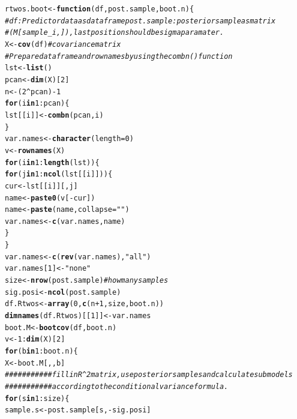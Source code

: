 \documentclass[11pt,a4paper,twoside]{book}\usepackage[]{graphicx}\usepackage[]{color}
\makeatletter
\newcommand{\hlnum}[1]{\textcolor[rgb]{0.686,0.059,0.569}{#1}}%
\newcommand{\hlstr}[1]{\textcolor[rgb]{0.192,0.494,0.8}{#1}}%
\newcommand{\hlcom}[1]{\textcolor[rgb]{0.678,0.584,0.686}{\textit{#1}}}%
\newcommand{\hlopt}[1]{\textcolor[rgb]{0,0,0}{#1}}%
\newcommand{\hlstd}[1]{\textcolor[rgb]{0.345,0.345,0.345}{#1}}%
\newcommand{\hlkwa}[1]{\textcolor[rgb]{0.161,0.373,0.58}{\textbf{#1}}}%
\newcommand{\hlkwb}[1]{\textcolor[rgb]{0.69,0.353,0.396}{#1}}%
\newcommand{\hlkwc}[1]{\textcolor[rgb]{0.333,0.667,0.333}{#1}}%
\newcommand{\hlkwd}[1]{\textcolor[rgb]{0.737,0.353,0.396}{\textbf{#1}}}%
\newenvironment{kframe}{%
 \def\at@end@of@kframe{}%
 \ifinner\ifhmode%
  \def\at@end@of@kframe{\end{minipage}}%
  \begin{minipage}{\columnwidth}%
 \fi\fi%
 \def\FrameCommand##1{\hskip\@totalleftmargin \hskip-\fboxsep
 \colorbox{shadecolor}{##1}\hskip-\fboxsep
     \hskip-\linewidth \hskip-\@totalleftmargin \hskip\columnwidth}%
 \MakeFramed {\advance\hsize-\width
   \@totalleftmargin\z@ \linewidth\hsize
   \@setminipage}}%
 {\par\unskip\endMakeFramed%
 \at@end@of@kframe}
\newenvironment{knitrout}{}{} %
\makeatother
\begin{document}
\begin{codeenv}
\begin{knitrout}
\begin{kframe}
\begin{alltt}
\hlstd{rtwos.boot} \hlkwb{<-} \hlkwa{function}\hlstd{(}\hlkwc{df}\hlstd{,} \hlkwc{post.sample}\hlstd{,} \hlkwc{boot.n}\hlstd{) \{}
    \hlcom{# df: Predictor data as data frame post.sample: posterior sample as matrix}
    \hlcom{# (M[sample_i,]), last position should be sigma paramater.}
    \hlstd{X} \hlkwb{<-} \hlkwd{cov}\hlstd{(df)}  \hlcom{#covariance matrix}
    \hlcom{# Prepare data frame and rownames by using the combn() function}
    \hlstd{lst} \hlkwb{<-} \hlkwd{list}\hlstd{()}
    \hlstd{pcan} \hlkwb{<-} \hlkwd{dim}\hlstd{(X)[}\hlnum{2}\hlstd{]}
    \hlstd{n} \hlkwb{<-} \hlstd{(}\hlnum{2}\hlopt{^}\hlstd{pcan)} \hlopt{-} \hlnum{1}
    \hlkwa{for} \hlstd{(i} \hlkwa{in} \hlnum{1}\hlopt{:}\hlstd{pcan) \{}
        \hlstd{lst[[i]]} \hlkwb{<-} \hlkwd{combn}\hlstd{(pcan, i)}
    \hlstd{\}}
    \hlstd{var.names} \hlkwb{<-} \hlkwd{character}\hlstd{(}\hlkwc{length} \hlstd{=} \hlnum{0}\hlstd{)}
    \hlstd{v} \hlkwb{<-} \hlkwd{rownames}\hlstd{(X)}
    \hlkwa{for} \hlstd{(i} \hlkwa{in} \hlnum{1}\hlopt{:}\hlkwd{length}\hlstd{(lst)) \{}
        \hlkwa{for} \hlstd{(j} \hlkwa{in} \hlnum{1}\hlopt{:}\hlkwd{ncol}\hlstd{(lst[[i]])) \{}
            \hlstd{cur} \hlkwb{<-} \hlstd{lst[[i]][, j]}
            \hlstd{name} \hlkwb{<-} \hlkwd{paste0}\hlstd{(v[}\hlopt{-}\hlstd{cur])}
            \hlstd{name} \hlkwb{<-} \hlkwd{paste}\hlstd{(name,} \hlkwc{collapse} \hlstd{=} \hlstr{" "}\hlstd{)}
            \hlstd{var.names} \hlkwb{<-} \hlkwd{c}\hlstd{(var.names, name)}
        \hlstd{\}}
    \hlstd{\}}
    \hlstd{var.names} \hlkwb{<-} \hlkwd{c}\hlstd{(}\hlkwd{rev}\hlstd{(var.names),} \hlstr{"all"}\hlstd{)}
    \hlstd{var.names[}\hlnum{1}\hlstd{]} \hlkwb{<-} \hlstr{"none"}
    \hlstd{size} \hlkwb{<-} \hlkwd{nrow}\hlstd{(post.sample)}  \hlcom{# how many samples}
    \hlstd{sig.posi} \hlkwb{<-} \hlkwd{ncol}\hlstd{(post.sample)}
    \hlstd{df.Rtwos} \hlkwb{<-} \hlkwd{array}\hlstd{(}\hlnum{0}\hlstd{,} \hlkwd{c}\hlstd{(n} \hlopt{+} \hlnum{1}\hlstd{, size, boot.n))}
    \hlkwd{dimnames}\hlstd{(df.Rtwos)[[}\hlnum{1}\hlstd{]]} \hlkwb{<-} \hlstd{var.names}
    \hlstd{boot.M} \hlkwb{<-} \hlkwd{bootcov}\hlstd{(df, boot.n)}
    \hlstd{v} \hlkwb{<-} \hlnum{1}\hlopt{:}\hlkwd{dim}\hlstd{(X)[}\hlnum{2}\hlstd{]}
    \hlkwa{for} \hlstd{(b} \hlkwa{in} \hlnum{1}\hlopt{:}\hlstd{boot.n) \{}
        \hlstd{X} \hlkwb{<-} \hlstd{boot.M[, , b]}
        \hlcom{########### fill in R^2 matrix, use posterior samples and calculate submodels}
        \hlcom{########### according to the conditional variance formula.}
        \hlkwa{for} \hlstd{(s} \hlkwa{in} \hlnum{1}\hlopt{:}\hlstd{size) \{}
            \hlstd{sample.s} \hlkwb{<-} \hlstd{post.sample[s,} \hlopt{-}\hlstd{sig.posi]}

\end{alltt}
\end{kframe}
\end{knitrout}
\end{codeenv}
\end{document}
